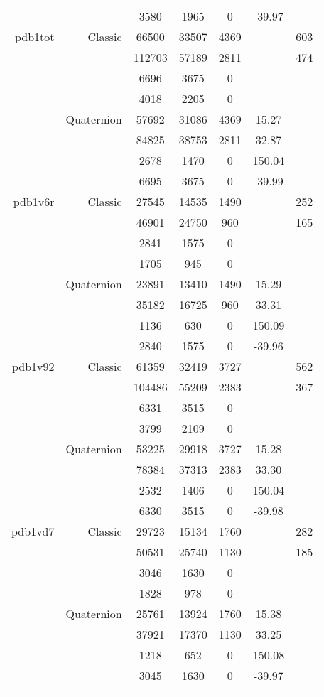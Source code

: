 \begin{xltabular}{\textwidth}{r|rcccSc}
& & 3580 & 1965 & 0 & -39.97 & \\ \addlinespace
pdb1tot & Classic & 66500 & 33507 & 4369 & & 603 \\
& & 112703 & 57189 & 2811 & & 474 \\
& & 6696 & 3675 & 0 & & \\
& & 4018 & 2205 & 0 & & \\
& Quaternion & 57692 & 31086 & 4369 & 15.27 & \\
& & 84825 & 38753 & 2811 & 32.87 & \\
& & 2678 & 1470 & 0 & 150.04 & \\
& & 6695 & 3675 & 0 & -39.99 & \\ \addlinespace
pdb1v6r & Classic & 27545 & 14535 & 1490 & & 252 \\
& & 46901 & 24750 & 960 & & 165 \\
& & 2841 & 1575 & 0 & & \\
& & 1705 & 945 & 0 & & \\
& Quaternion & 23891 & 13410 & 1490 & 15.29 & \\
& & 35182 & 16725 & 960 & 33.31 & \\
& & 1136 & 630 & 0 & 150.09 & \\
& & 2840 & 1575 & 0 & -39.96 & \\ \addlinespace
pdb1v92 & Classic & 61359 & 32419 & 3727 & & 562 \\
& & 104486 & 55209 & 2383 & & 367 \\
& & 6331 & 3515 & 0 & & \\
& & 3799 & 2109 & 0 & & \\
& Quaternion & 53225 & 29918 & 3727 & 15.28 & \\
& & 78384 & 37313 & 2383 & 33.30 & \\
& & 2532 & 1406 & 0 & 150.04 & \\
& & 6330 & 3515 & 0 & -39.98 & \\ \addlinespace
pdb1vd7 & Classic & 29723 & 15134 & 1760 & & 282 \\
& & 50531 & 25740 & 1130 & & 185 \\
& & 3046 & 1630 & 0 & & \\
& & 1828 & 978 & 0 & & \\
& Quaternion & 25761 & 13924 & 1760 & 15.38 & \\
& & 37921 & 17370 & 1130 & 33.25 & \\
& & 1218 & 652 & 0 & 150.08 & \\
& & 3045 & 1630 & 0 & -39.97 & \\ \addlinespace

\end{xltabular}
